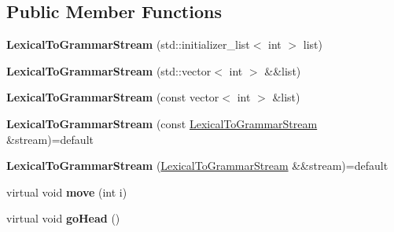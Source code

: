 \subsection*{Public Member Functions}
\begin{DoxyCompactItemize}
\item 
\mbox{\label{classx2_1_1_lexical_to_grammar_stream_a393596cd9ceaabd4a4fdf0a7fcea4a2c}} 
{\bfseries Lexical\+To\+Grammar\+Stream} (std\+::initializer\+\_\+list$<$ int $>$ list)
\item 
\mbox{\label{classx2_1_1_lexical_to_grammar_stream_aae745125e58536eb4e56ec821723031a}} 
{\bfseries Lexical\+To\+Grammar\+Stream} (std\+::vector$<$ int $>$ \&\&list)
\item 
\mbox{\label{classx2_1_1_lexical_to_grammar_stream_a334aecb6568d8f30bfac37860b99833d}} 
{\bfseries Lexical\+To\+Grammar\+Stream} (const vector$<$ int $>$ \&list)
\item 
\mbox{\label{classx2_1_1_lexical_to_grammar_stream_ad4c04605d8dbb125211f79ecc8b9322d}} 
{\bfseries Lexical\+To\+Grammar\+Stream} (const \hyperlink{classx2_1_1_lexical_to_grammar_stream}{Lexical\+To\+Grammar\+Stream} \&stream)=default
\item 
\mbox{\label{classx2_1_1_lexical_to_grammar_stream_affeee9707cacd9923627104ab667a8c6}} 
{\bfseries Lexical\+To\+Grammar\+Stream} (\hyperlink{classx2_1_1_lexical_to_grammar_stream}{Lexical\+To\+Grammar\+Stream} \&\&stream)=default
\item 
\mbox{\label{classx2_1_1_lexical_to_grammar_stream_ac0aadf8b4d8a98218accbd6983f40c85}} 
virtual void {\bfseries move} (int i)
\item 
\mbox{\label{classx2_1_1_lexical_to_grammar_stream_a120b0b329f7dbc1dce5c4fd5614be764}} 
virtual void {\bfseries go\+Head} ()
\item 
\mbox{\label{classx2_1_1_lexical_to_grammar_stream_a418c04a6f99d13068bcfafae19a5fcf5}} 

\end{DoxyCompactItemize}

